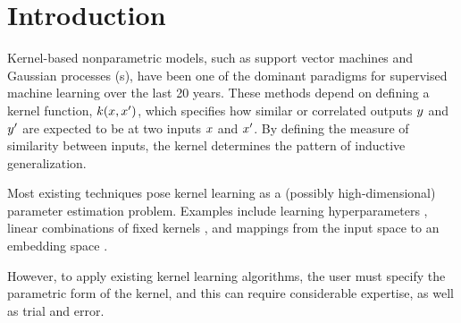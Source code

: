 \documentclass[twoside]{article}
\begin{document}

\section{Introduction}

Kernel-based nonparametric models, such as support vector machines and Gaussian processes (\gp{}s), have been one of the dominant paradigms for supervised machine learning over the last 20 years.
These methods depend on defining a kernel function, $k(x,x')$, which specifies how similar or correlated outputs $y$ and $y'$ are expected to be at two inputs $x$ and $x'$.
By defining the measure of similarity between inputs, the kernel determines the pattern of inductive generalization.

Most existing techniques pose kernel learning as a (possibly high-dimensional) parameter estimation problem.
Examples include learning hyperparameters \cite{rasmussen38gaussian}, linear combinations of fixed kernels \cite{Bach_HKL}, and mappings from the input space to an embedding space \cite{salakhutdinov2008using}.

However, to apply existing kernel learning algorithms, the user must specify the parametric form of the kernel, and this can require considerable expertise, as well as trial and error.
\end{document}
